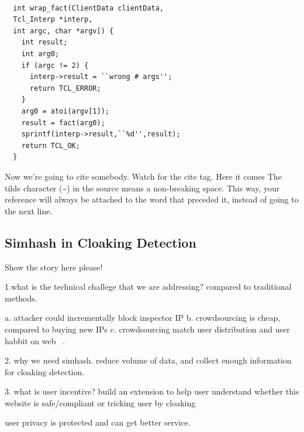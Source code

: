 {\tt \small
  \begin{verbatim}
  int wrap_fact(ClientData clientData,
  Tcl_Interp *interp,
  int argc, char *argv[) {
    int result;
    int arg0;
    if (argc != 2) {
      interp->result = ``wrong # args'';
      return TCL_ERROR;
    }
    arg0 = atoi(argv[1]);
    result = fact(arg0);
    sprintf(interp->result,``%d'',result);
    return TCL_OK;
  }
  \end{verbatim}
}

Now we're going to cite somebody.  Watch
for the cite tag.
Here it comes%
The tilde character (\~{})
in the source means a non-breaking space.
This way, your reference will
always be attached to the word that preceded it,
instead of going to the
next line.


\subsection{Simhash in Cloaking Detection}
Show the story here please!

1.what is the technical challege that we are addressing? compared to traditional
methods.

a. attacker could incrementally block inspector IP
b. crowdsourcing is cheap, compared to buying new IPs
c. crowdsourcing match user distribution and user habbit on web ~\cite{wang2011cloak}.

2. why we need simhash.
reduce volume of data, and collect enough information for cloaking detection.


3. what is user incentive?
build an extension to help user understand whether this website is
safe/compliant or tricking user by cloaking

user privacy is protected and can get better service.




